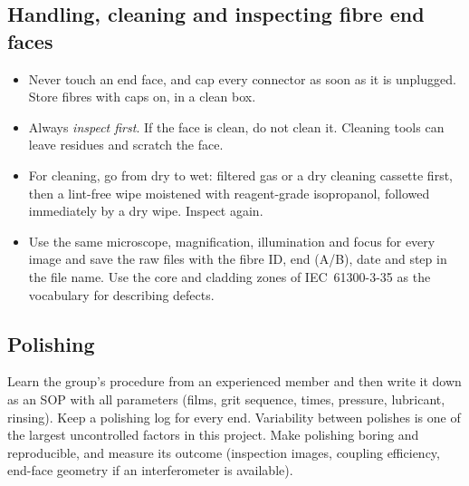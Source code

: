 \subsection{Handling, cleaning and inspecting fibre end faces}
\begin{itemize}
  \item Never touch an end face, and cap every connector as soon as it is unplugged. Store fibres with
        caps on, in a clean box.
  \item Always \emph{inspect first}. If the face is clean, do not clean it. Cleaning tools can leave
        residues and scratch the face.
  \item For cleaning, go from dry to wet: filtered gas or a dry cleaning cassette first, then a
        lint-free wipe moistened with reagent-grade isopropanol, followed immediately by a dry wipe.
        Inspect again.
  \item Use the same microscope, magnification, illumination and focus for every image and save the
        raw files with the fibre ID, end (A/B), date and step in the file name. Use the core and cladding
        zones of IEC~61300-3-35 as the vocabulary for describing defects.
\end{itemize}

\subsection{Polishing}
Learn the group's procedure from an experienced member and then write it down as an SOP with all
parameters (films, grit sequence, times, pressure, lubricant, rinsing). Keep a polishing log for every
end. Variability between polishes is one of the largest uncontrolled factors in this project. Make
polishing boring and reproducible, and measure its outcome (inspection images, coupling efficiency,
end-face geometry if an interferometer is available).

